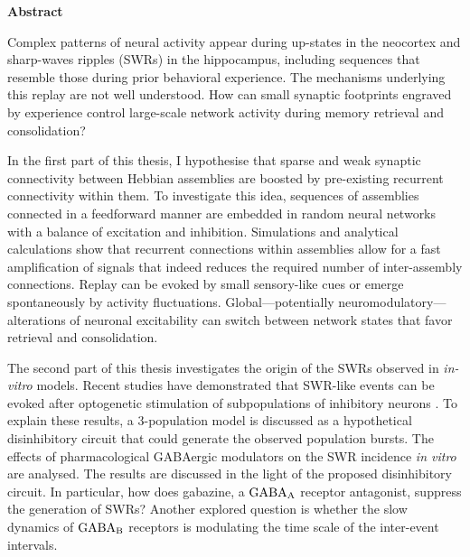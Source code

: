 \huge\textbf{Abstract}
\normalsize
\vspace{10mm}


Complex patterns of neural activity appear during up-states in the neocortex
and sharp-waves ripples (SWRs) in the hippocampus, including sequences that
resemble those during prior behavioral experience. The mechanisms underlying
this replay are not well understood. How can small synaptic footprints engraved
by experience control large-scale network activity during memory retrieval and
consolidation?

In the first part of this thesis, I hypothesise that sparse and weak
synaptic connectivity between Hebbian assemblies are boosted by pre-existing
recurrent connectivity within them. To investigate this idea, sequences of
assemblies connected in a feedforward manner are embedded in random neural
networks with a balance of excitation and inhibition. Simulations and
analytical calculations show that recurrent connections within assemblies allow
for a fast amplification of signals that indeed reduces the required number of
inter-assembly connections. Replay can be evoked by small sensory-like cues or
emerge spontaneously by activity fluctuations. Global---potentially
neuromodulatory---alterations of neuronal excitability can switch between
network states that favor retrieval and consolidation.

The second part of this thesis investigates the origin of the SWRs observed in
\textit{in-vitro} models. Recent studies have demonstrated that SWR-like events
can be evoked after optogenetic stimulation of subpopulations of inhibitory
neurons \citep{Schlingloff2014, Kohus2016}. To explain these results, a
3-population model is discussed as a hypothetical disinhibitory circuit that
could generate the observed population bursts. The effects of pharmacological
GABAergic modulators on the SWR incidence \textit{in vitro} are analysed. The
results are discussed in the light of the proposed disinhibitory circuit. In
particular, how does gabazine, a $\rm GABA_A$ receptor antagonist, suppress the
generation of SWRs? Another explored question is whether the slow dynamics of
$\rm GABA_B$ receptors is modulating the time scale of the inter-event
intervals.

\newpage
